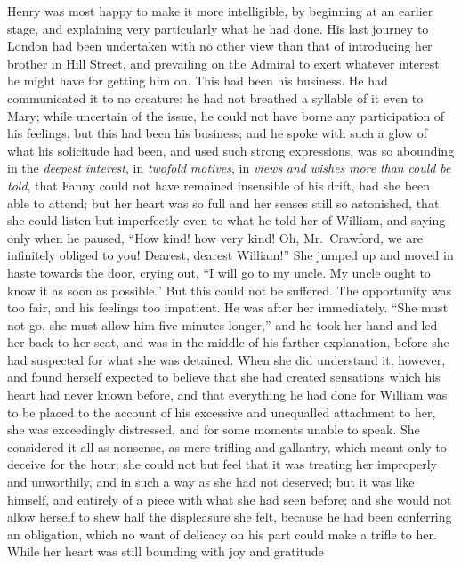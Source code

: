 Henry was most happy to make it more intelligible,
by beginning at an earlier stage, and explaining very
particularly what he had done.  His last journey to London
had been undertaken with no other view than that of
introducing her brother in Hill Street, and prevailing
on the Admiral to exert whatever interest he might
have for getting him on.  This had been his business.
He had communicated it to no creature:  he had not
breathed a syllable of it even to Mary; while uncertain
of the issue, he could not have borne any participation
of his feelings, but this had been his business; and he
spoke with such a glow of what his solicitude had been,
and used such strong expressions, was so abounding
in the \emph{deepest} \emph{interest}, in \emph{twofold} \emph{motives},
in \emph{views} \emph{and} \emph{wishes} \emph{more} \emph{than} \emph{could} \emph{be} \emph{told},
that Fanny could not have remained insensible of his drift,
had she been able to attend; but her heart was so full
and her senses still so astonished, that she could listen
but imperfectly even to what he told her of William,
and saying only when he paused, ``How kind! how very kind!
Oh, Mr.\ Crawford, we are infinitely obliged to you!
Dearest, dearest William!''  She jumped up and moved in haste
towards the door, crying out, ``I will go to my uncle.
My uncle ought to know it as soon as possible.''  But this
could not be suffered.  The opportunity was too fair,
and his feelings too impatient.  He was after her immediately.
``She must not go, she must allow him five minutes longer,''
and he took her hand and led her back to her seat,
and was in the middle of his farther explanation,
before she had suspected for what she was detained.
When she did understand it, however, and found herself
expected to believe that she had created sensations which
his heart had never known before, and that everything
he had done for William was to be placed to the account
of his excessive and unequalled attachment to her,
she was exceedingly distressed, and for some moments
unable to speak.  She considered it all as nonsense,
as mere trifling and gallantry, which meant only to deceive
for the hour; she could not but feel that it was treating
her improperly and unworthily, and in such a way as she
had not deserved; but it was like himself, and entirely
of a piece with what she had seen before; and she would
not allow herself to shew half the displeasure she felt,
because he had been conferring an obligation, which no
want of delicacy on his part could make a trifle to her.
While her heart was still bounding with joy and gratitude
